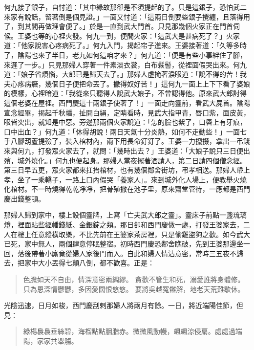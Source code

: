 何九接了銀子，自忖道：「其中緣故那卻是不須提起的了。只是這銀子，恐怕武二來家有說話，留著倒是個見證。」一面又忖道：「這兩日倒要些銀子攪纏，且落得用了，到其間再做理會便了。」於是一直到武大門首。只見那幾個火家正在門首伺候。王婆也等的心裡火發。何九一到，便間火家：「這武大是甚病死了？」火家道：「他家說害心疼病死了。」何九入門，揭起帘子進來。王婆接著道：「久等多時了，陰陽也來了半日，老九如何這咱才來？」何九道：「便是有些小事絆住了腳，來遲了一步。」只見那婦人穿著一件素淡衣裳，白布鬏髻，從裡面假哭出來。何九道：「娘子省煩惱，大郎已是歸天去了。」那婦人虛掩著淚眼道：「說不得的苦！我夫心疼病癥，幾個日子便把命丟了。撇得奴好苦！」這何九一面上上下下看了婆娘的模樣，心裡暗道：「我從來只聽得人說武大娘子，不曾認得他。原來武大郎討得這個老婆在屋裡。西門慶這十兩銀子使著了！」一面走向靈前，看武大屍首。陰陽宣念經畢，揭起千秋幡，扯開白絹，定睛看時，見武大指甲青，唇口紫，面皮黃，眼皆突出，就知是中惡。旁邊那兩個火家說道：「怎的臉也紫了，口唇上有牙痕，口中出血？」何九道：「休得胡說！兩日天氣十分炎熱，如何不走動些！」一面七手八腳葫蘆提殮了，裝入棺材內，兩下用長命釘釘了。王婆一力攛掇，拿出一弔錢來與何九，打發眾火家去了，就問：「幾時出去？」王婆道：「大娘子說只三日便出殯，城外燒化。」何九也便起身。那婦人當夜擺著酒請人，第二日請四個僧念經。第三日早五更，眾火家都來扛抬棺材，也有幾個鄰舍街坊，弔孝相送。那婦人帶上孝，坐了一乘轎子，一路上口內假哭「養家人」。來到城外化人場上，便教舉火燒化棺材。不一時燒得乾乾凈凈，把骨殖撒在池子里，原來齋堂管待，一應都是西門慶出錢整頓。

那婦人歸到家中，樓上設個靈牌，上寫「亡夫武大郎之靈」。靈床子前點一盞琉璃燈，裡面貼些經幡錢紙、金銀錠之類。那日卻和西門慶做一處，打發王婆家去，二人在樓上任意縱橫取樂，不比先前在王婆家茶房裡，只是偷雞盜狗之歡。如今武大已死，家中無人，兩個肆意停眠整宿。初時西門慶恐鄰舍瞧破，先到王婆那邊坐一回，落後帶著小廝竟從婦人家後門而入。自此和婦人情沾意密，常時三五夜不歸去，把家中大小丟得七顛八倒，都不歡喜。正是：
\begin{quote}
色膽如天不自由，情深意密兩綢繆。
貪歡不管生和死，溺愛誰將身體修。
只為恩深情鬱鬱，多因愛闊恨悠悠。
要將吳越冤讎解，地老天荒難歇休。
\end{quote}

光陰迅速，日月如梭，西門慶刮剌那婦人將兩月有餘。一日，將近端陽佳節，但見：
\begin{quote}
綠楊裊裊垂絲碧，海榴點點胭脂赤。微微風動幔，颯颯涼侵扇。處處過端陽，家家共舉觴。
\end{quote}

